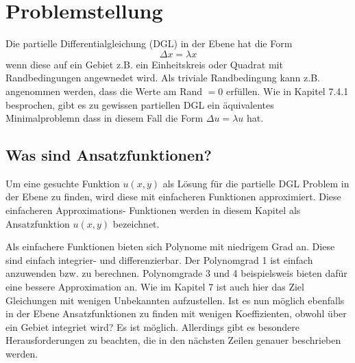 %
%
%
\section{Problemstellung
\label{fem:section:problemstellung}}
Die partielle Differentialgleichung (DGL) in der Ebene hat die Form 
\begin{equation}
	\Delta x = \lambda x
	\label{fem:equationPDE}
\end{equation}
wenn diese auf ein Gebiet z.B. ein Einheitskreis oder Quadrat mit Randbedingungen angewnedet wird. Als triviale Randbedingung kann z.B. angenommen werden, dass die Werte am Rand $= 0$ erfüllen. Wie in Kapitel 7.4.1 besprochen, gibt es zu gewissen partiellen DGL ein äquivalentes Minimalproblemn dass in diesem Fall die Form $\Delta u = \lambda u$ hat.

\subsection{Was sind Ansatzfunktionen?}
Um eine gesuchte Funktion $u(x,y)$ als Lösung für die partielle DGL Problem in der Ebene zu finden, wird diese mit einfacheren Funktionen approximiert. Diese einfacheren Approximations- Funktionen werden in diesem Kapitel als Ansatzfunktion $u(x,y)$ bezeichnet. %

Als einfachere Funktionen bieten sich Polynome mit niedrigem Grad an. Diese sind einfach integrier- und differenzierbar. Der Polynomgrad 1 ist einfach anzuwenden bzw. zu berechnen. Polynomgrade 3 und 4 beispielsweis bieten dafür eine bessere Approximation an. Wie im Kapitel 7 ist auch hier das Ziel Gleichungen mit wenigen Unbekannten aufzustellen. Ist es nun möglich ebenfalls in der Ebene Ansatzfunktionen zu finden mit wenigen Koeffizienten, obwohl über ein Gebiet integriet wird? Es ist möglich. Allerdings gibt es besondere Herausforderungen zu beachten, die in den nächsten Zeilen genauer beschrieben werden.



